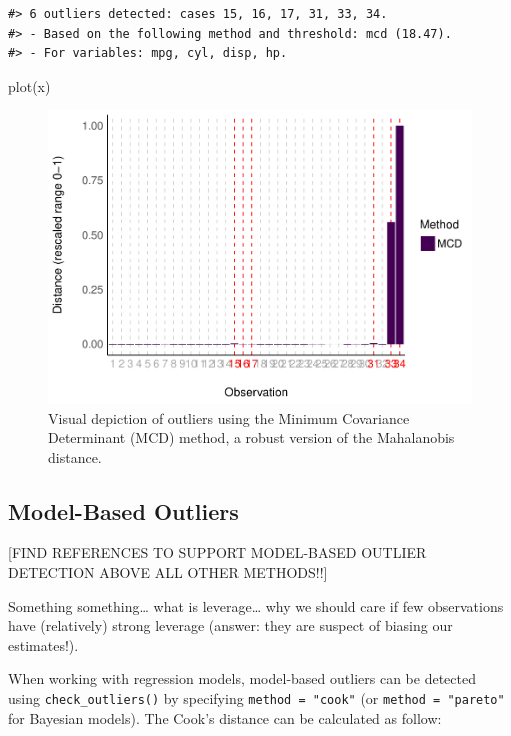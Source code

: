 \documentclass[
]{article}
\newenvironment{Shaded}{\begin{snugshade}}{\end{snugshade}}
\newcommand{\FunctionTok}[1]{\textcolor[rgb]{0.00,0.00,0.00}{#1}}
\newcommand{\NormalTok}[1]{#1}
\begin{document}
\begin{verbatim}
#> 6 outliers detected: cases 15, 16, 17, 31, 33, 34.
#> - Based on the following method and threshold: mcd (18.47).
#> - For variables: mpg, cyl, disp, hp.
\end{verbatim}

\begin{Shaded}
\begin{Highlighting}[]
\FunctionTok{plot}\NormalTok{(x)}
\end{Highlighting}
\end{Shaded}

\begin{figure}
\includegraphics[width=1\linewidth]{paper_files/figure-latex/multivariate-1} \caption{Visual depiction of outliers using the Minimum Covariance Determinant (MCD) method, a robust version of the Mahalanobis distance.}\label{fig:multivariate}
\end{figure}

\hypertarget{model-based-outliers}{%
\subsection{Model-Based Outliers}\label{model-based-outliers}}

{[}FIND REFERENCES TO SUPPORT MODEL-BASED OUTLIER DETECTION ABOVE ALL OTHER METHODS!!{]}

Something something\ldots{} what is leverage\ldots{} why we should care if few observations have (relatively) strong leverage (answer: they are suspect of biasing our estimates!).

When working with regression models, model-based outliers can be detected using \texttt{check\_outliers()} by specifying \texttt{method\ =\ "cook"} (or \texttt{method\ =\ "pareto"} for Bayesian models). The Cook's distance can be calculated as follow:
\end{document}

